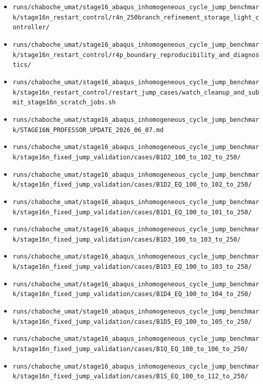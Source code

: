 \documentclass[11pt,a4paper]{article}
\newcommand{\code}[1]{\texttt{#1}}
\begin{document}
\begin{itemize}
  \item \code{runs/chaboche\_umat/stage16\_abaqus\_inhomogeneous\_cycle\_jump\_benchmark/stage16n\_restart\_control/r4n\_250branch\_refinement\_storage\_light\_controller/}
  \item \code{runs/chaboche\_umat/stage16\_abaqus\_inhomogeneous\_cycle\_jump\_benchmark/stage16n\_restart\_control/r4p\_boundary\_reproducibility\_and\_diagnostics/}
  \item \code{runs/chaboche\_umat/stage16\_abaqus\_inhomogeneous\_cycle\_jump\_benchmark/stage16n\_restart\_control/restart\_jump\_cases/watch\_cleanup\_and\_submit\_stage16n\_scratch\_jobs.sh}
  \item \code{runs/chaboche\_umat/stage16\_abaqus\_inhomogeneous\_cycle\_jump\_benchmark/STAGE16N\_PROFESSOR\_UPDATE\_2026\_06\_07.md}
  \item \code{runs/chaboche\_umat/stage16\_abaqus\_inhomogeneous\_cycle\_jump\_benchmark/stage16n\_fixed\_jump\_validation/cases/B1D2\_100\_to\_102\_to\_250/}
  \item \code{runs/chaboche\_umat/stage16\_abaqus\_inhomogeneous\_cycle\_jump\_benchmark/stage16n\_fixed\_jump\_validation/cases/B1D2\_EQ\_100\_to\_102\_to\_250/}
  \item \code{runs/chaboche\_umat/stage16\_abaqus\_inhomogeneous\_cycle\_jump\_benchmark/stage16n\_fixed\_jump\_validation/cases/B1D1\_EQ\_100\_to\_101\_to\_250/}
  \item \code{runs/chaboche\_umat/stage16\_abaqus\_inhomogeneous\_cycle\_jump\_benchmark/stage16n\_fixed\_jump\_validation/cases/B1D3\_100\_to\_103\_to\_250/}
  \item \code{runs/chaboche\_umat/stage16\_abaqus\_inhomogeneous\_cycle\_jump\_benchmark/stage16n\_fixed\_jump\_validation/cases/B1D3\_EQ\_100\_to\_103\_to\_250/}
  \item \code{runs/chaboche\_umat/stage16\_abaqus\_inhomogeneous\_cycle\_jump\_benchmark/stage16n\_fixed\_jump\_validation/cases/B1D4\_EQ\_100\_to\_104\_to\_250/}
  \item \code{runs/chaboche\_umat/stage16\_abaqus\_inhomogeneous\_cycle\_jump\_benchmark/stage16n\_fixed\_jump\_validation/cases/B1D5\_EQ\_100\_to\_105\_to\_250/}
  \item \code{runs/chaboche\_umat/stage16\_abaqus\_inhomogeneous\_cycle\_jump\_benchmark/stage16n\_fixed\_jump\_validation/cases/B1Q\_EQ\_100\_to\_106\_to\_250/}
  \item \code{runs/chaboche\_umat/stage16\_abaqus\_inhomogeneous\_cycle\_jump\_benchmark/stage16n\_fixed\_jump\_validation/cases/B1S\_EQ\_100\_to\_112\_to\_250/}

\end{itemize}
\end{document}
